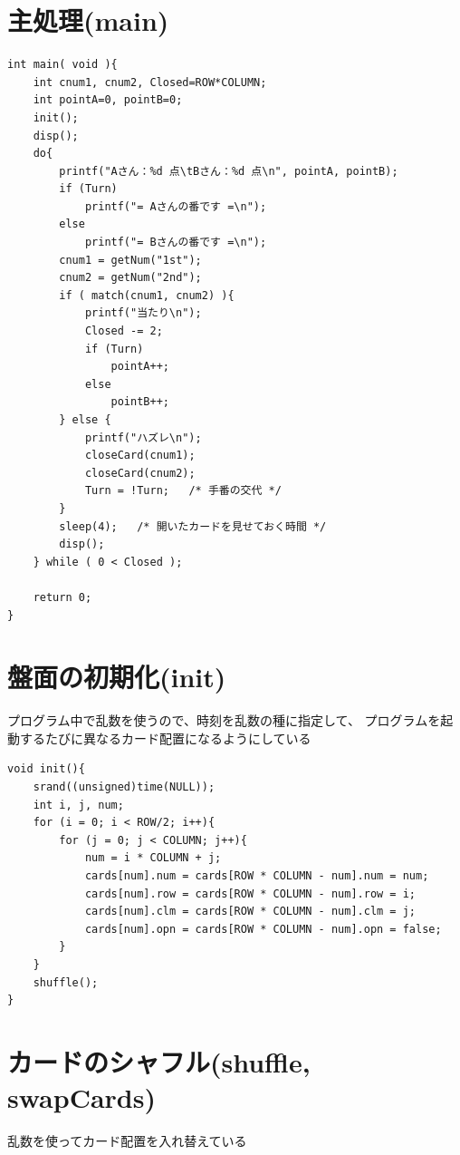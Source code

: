 \documentclass[uplatex,a4paper,11pt,oneside,openany]{jsbook}
\begin{document}
\newpage

\section{主処理(main)}

\begin{lstlisting}
int main( void ){
    int cnum1, cnum2, Closed=ROW*COLUMN;
    int pointA=0, pointB=0;
    init();
    disp();
    do{
        printf("Aさん：%d 点\tBさん：%d 点\n", pointA, pointB);
        if (Turn)
            printf("= Aさんの番です =\n");
        else
            printf("= Bさんの番です =\n");
        cnum1 = getNum("1st");
        cnum2 = getNum("2nd");
        if ( match(cnum1, cnum2) ){
            printf("当たり\n");
            Closed -= 2;
            if (Turn)
                pointA++;
            else
                pointB++;
        } else {
            printf("ハズレ\n");
            closeCard(cnum1);
            closeCard(cnum2);
            Turn = !Turn;   /* 手番の交代 */
        }
        sleep(4);   /* 開いたカードを見せておく時間 */
        disp();
    } while ( 0 < Closed );

    return 0;
}
\end{lstlisting}

\section{盤面の初期化(init)}

プログラム中で乱数を使うので、時刻を乱数の種に指定して、
プログラムを起動するたびに異なるカード配置になるようにしている

\begin{lstlisting}
void init(){
    srand((unsigned)time(NULL));
    int i, j, num;
    for (i = 0; i < ROW/2; i++){
        for (j = 0; j < COLUMN; j++){
            num = i * COLUMN + j;
            cards[num].num = cards[ROW * COLUMN - num].num = num;
            cards[num].row = cards[ROW * COLUMN - num].row = i;
            cards[num].clm = cards[ROW * COLUMN - num].clm = j;
            cards[num].opn = cards[ROW * COLUMN - num].opn = false;
        }
    }
    shuffle();
}
\end{lstlisting}

\section{カードのシャフル(shuffle, swapCards)}

乱数を使ってカード配置を入れ替えている
\end{document}
